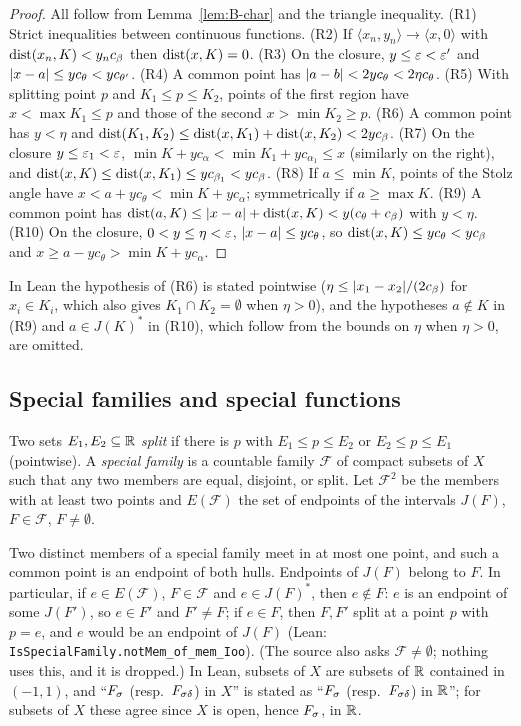 \begin{proof}
All follow from Lemma~\ref{lem:B-char} and the triangle inequality.
(R1) Strict inequalities between continuous functions. (R2) If $\langle x_n,y_n\rangle\to\langle x,0\rangle$ with
$\operatorname{dist}(x_n,K)<y_nc_\beta$ then $\operatorname{dist}(x,K)=0$. (R3) On the closure, $y\le\varepsilon<\varepsilon'$ and $\lvert x-a\rvert\le yc_\theta<yc_{\theta'}$.
(R4) A common point has $\lvert a-b\rvert<2yc_\theta<2\eta c_\theta$. (R5) With splitting point $p$ and $K_1\le p\le K_2$,
points of the first region have $x<\max K_1\le p$ and those of the second $x>\min K_2\ge p$. (R6) A common point
has $y<\eta$ and $\operatorname{dist}(K_1,K_2)\le\operatorname{dist}(x,K_1)+\operatorname{dist}(x,K_2)<2yc_\beta$. (R7) On the closure $y\le\varepsilon_1<\varepsilon$,
$\min K+yc_\alpha<\min K_1+yc_{\alpha_1}\le x$ (similarly on the right), and $\operatorname{dist}(x,K)\le\operatorname{dist}(x,K_1)\le yc_{\beta_1}<yc_\beta$.
(R8) If $a\le\min K$, points of the Stolz angle have $x<a+yc_\theta<\min K+yc_\alpha$; symmetrically if $a\ge\max K$. (R9) A common point has
$\operatorname{dist}(a,K)\le\lvert x-a\rvert+\operatorname{dist}(x,K)<y(c_\theta+c_\beta)$ with $y<\eta$. (R10) On the closure, $0<y\le\eta<\varepsilon$,
$\lvert x-a\rvert\le yc_\theta$, so $\operatorname{dist}(x,K)\le yc_\theta<yc_\beta$ and $x\ge a-yc_\theta>\min K+yc_\alpha$.
\end{proof}
In Lean the hypothesis of (R6) is stated pointwise ($\eta\le\lvert x_1-x_2\rvert/(2c_\beta)$ for $x_i\in K_i$, which also
gives $K_1\cap K_2=\emptyset$ when $\eta>0$), and the hypotheses $a\notin K$ in (R9) and $a\in J(K)^*$ in (R10),
which follow from the bounds on $\eta$ when $\eta>0$, are omitted.

\subsection{Special families and special functions}

\begin{definition}\label{def:special-family}
Two sets $E_1,E_2\subseteq\mathbb{R}$ \emph{split} if there is $p$ with $E_1\le p\le E_2$ or $E_2\le p\le E_1$ (pointwise). A
\emph{special family} is a countable family $\mathcal F$ of compact subsets of $X$ such that any two members
are equal, disjoint, or split. Let $\mathcal F^2$ be the members with at least two points and $E(\mathcal F)$ the set of
endpoints of the intervals $J(F)$, $F\in\mathcal F$, $F\ne\emptyset$.
\end{definition}
Two distinct members of a special family meet in at most one point, and such a common point is an endpoint of both
hulls. Endpoints of $J(F)$ belong to $F$. In particular, if $e\in E(\mathcal F)$, $F\in\mathcal F$ and $e\in J(F)^*$, then
$e\notin F$: $e$ is an endpoint of some $J(F')$, so $e\in F'$ and $F'\ne F$; if $e\in F$, then $F,F'$ split at a point $p$
with $p=e$, and $e$ would be an endpoint of $J(F)$ (Lean: \texttt{IsSpecialFamily.notMem\_of\_mem\_Ioo}).
(The source also asks $\mathcal F\ne\emptyset$; nothing uses this, and it is dropped.) In Lean, subsets of $X$ are subsets
of $\mathbb{R}$ contained in $(-1,1)$, and ``$F_\sigma$ (resp.\ $F_{\sigma\delta}$) in $X$'' is stated as ``$F_\sigma$ (resp.\ $F_{\sigma\delta}$) in $\mathbb{R}$''; for
subsets of $X$ these agree since $X$ is open, hence $F_\sigma$, in $\mathbb{R}$.

